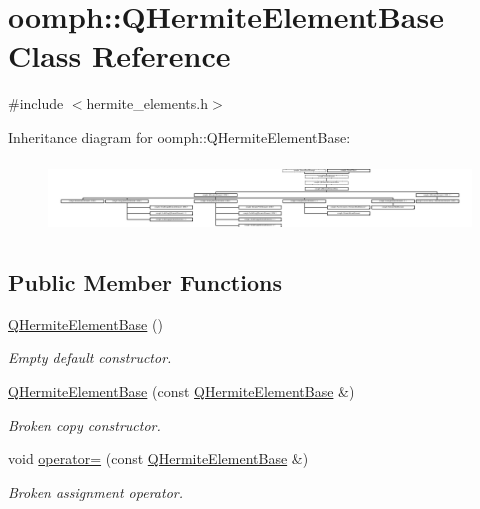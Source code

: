 \hypertarget{classoomph_1_1QHermiteElementBase}{}\section{oomph\+:\+:Q\+Hermite\+Element\+Base Class Reference}
\label{classoomph_1_1QHermiteElementBase}


{\ttfamily \#include $<$hermite\+\_\+elements.\+h$>$}

Inheritance diagram for oomph\+:\+:Q\+Hermite\+Element\+Base\+:\begin{figure}[H]
\begin{center}
\leavevmode
\includegraphics[height=1.920439cm]{classoomph_1_1QHermiteElementBase}
\end{center}
\end{figure}
\subsection*{Public Member Functions}
\begin{DoxyCompactItemize}
\item 
\hyperlink{classoomph_1_1QHermiteElementBase_a2812a3e9c4a74144f5e81424fc2c2efa}{Q\+Hermite\+Element\+Base} ()
\begin{DoxyCompactList}\small\item\em Empty default constructor. \end{DoxyCompactList}\item 
\hyperlink{classoomph_1_1QHermiteElementBase_a8cd59a73c2cdada6c096a9b5a9a209c5}{Q\+Hermite\+Element\+Base} (const \hyperlink{classoomph_1_1QHermiteElementBase}{Q\+Hermite\+Element\+Base} \&)
\begin{DoxyCompactList}\small\item\em Broken copy constructor. \end{DoxyCompactList}\item 
void \hyperlink{classoomph_1_1QHermiteElementBase_af741c8a7a04d2bb791d54d4cd01c8640}{operator=} (const \hyperlink{classoomph_1_1QHermiteElementBase}{Q\+Hermite\+Element\+Base} \&)
\begin{DoxyCompactList}\small\item\em Broken assignment operator. \end{DoxyCompactList}\end{DoxyCompactItemize}
